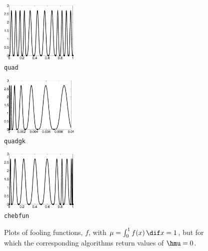 \documentclass[graybox]{svmult}
\begin{document}
\begin{figure}
\centering
\begin{minipage}{3.7cm} \centering \includegraphics[width=3.7cm]{Foolquadbw.eps} \\ {\tt quad} \end{minipage}
\begin{minipage}{3.7cm} \centering \includegraphics[width=3.7cm]{Foolquadgkbw.eps} \\ {\tt quadgk} \end{minipage}
\begin{minipage}{3.7cm} \centering \includegraphics[width=3.7cm]{Foolchebintbw.eps} \\ {\tt chebfun} \end{minipage}
\caption{Plots of fooling functions, $f$, with $\mu=\int_0^1 f(x) \, \dif x=1$, but for which the corresponding algorithms return values of $\hmu=0$. \label{foolfunfig}}
\end{figure}
\end{document}
